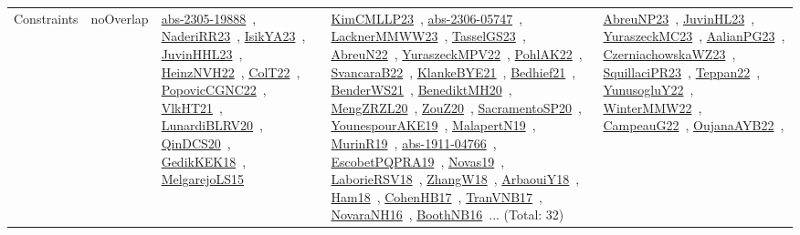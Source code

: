 {\begin{longtable}{lp{3cm}>{\raggedright\arraybackslash}p{6cm}>{\raggedright\arraybackslash}p{6cm}>{\raggedright\arraybackslash}p{8cm}}
Constraints & noOverlap & \href{works/abs-2305-19888.pdf}{abs-2305-19888}~\cite{abs-2305-19888}, \href{works/NaderiRR23.pdf}{NaderiRR23}~\cite{NaderiRR23}, \href{works/IsikYA23.pdf}{IsikYA23}~\cite{IsikYA23}, \href{works/JuvinHHL23.pdf}{JuvinHHL23}~\cite{JuvinHHL23}, \href{works/HeinzNVH22.pdf}{HeinzNVH22}~\cite{HeinzNVH22}, \href{works/ColT22.pdf}{ColT22}~\cite{ColT22}, \href{works/PopovicCGNC22.pdf}{PopovicCGNC22}~\cite{PopovicCGNC22}, \href{works/VlkHT21.pdf}{VlkHT21}~\cite{VlkHT21}, \href{works/LunardiBLRV20.pdf}{LunardiBLRV20}~\cite{LunardiBLRV20}, \href{works/QinDCS20.pdf}{QinDCS20}~\cite{QinDCS20}, \href{works/GedikKEK18.pdf}{GedikKEK18}~\cite{GedikKEK18}, \href{works/MelgarejoLS15.pdf}{MelgarejoLS15}~\cite{MelgarejoLS15} & \href{works/KimCMLLP23.pdf}{KimCMLLP23}~\cite{KimCMLLP23}, \href{works/abs-2306-05747.pdf}{abs-2306-05747}~\cite{abs-2306-05747}, \href{works/LacknerMMWW23.pdf}{LacknerMMWW23}~\cite{LacknerMMWW23}, \href{works/TasselGS23.pdf}{TasselGS23}~\cite{TasselGS23}, \href{works/AbreuN22.pdf}{AbreuN22}~\cite{AbreuN22}, \href{works/YuraszeckMPV22.pdf}{YuraszeckMPV22}~\cite{YuraszeckMPV22}, \href{works/PohlAK22.pdf}{PohlAK22}~\cite{PohlAK22}, \href{works/SvancaraB22.pdf}{SvancaraB22}~\cite{SvancaraB22}, \href{works/KlankeBYE21.pdf}{KlankeBYE21}~\cite{KlankeBYE21}, \href{works/Bedhief21.pdf}{Bedhief21}~\cite{Bedhief21}, \href{works/BenderWS21.pdf}{BenderWS21}~\cite{BenderWS21}, \href{works/BenediktMH20.pdf}{BenediktMH20}~\cite{BenediktMH20}, \href{works/MengZRZL20.pdf}{MengZRZL20}~\cite{MengZRZL20}, \href{works/ZouZ20.pdf}{ZouZ20}~\cite{ZouZ20}, \href{works/SacramentoSP20.pdf}{SacramentoSP20}~\cite{SacramentoSP20}, \href{works/YounespourAKE19.pdf}{YounespourAKE19}~\cite{YounespourAKE19}, \href{works/MalapertN19.pdf}{MalapertN19}~\cite{MalapertN19}, \href{works/MurinR19.pdf}{MurinR19}~\cite{MurinR19}, \href{works/abs-1911-04766.pdf}{abs-1911-04766}~\cite{abs-1911-04766}, \href{works/EscobetPQPRA19.pdf}{EscobetPQPRA19}~\cite{EscobetPQPRA19}, \href{works/Novas19.pdf}{Novas19}~\cite{Novas19}, \href{works/LaborieRSV18.pdf}{LaborieRSV18}~\cite{LaborieRSV18}, \href{works/ZhangW18.pdf}{ZhangW18}~\cite{ZhangW18}, \href{works/ArbaouiY18.pdf}{ArbaouiY18}~\cite{ArbaouiY18}, \href{works/Ham18.pdf}{Ham18}~\cite{Ham18}, \href{works/CohenHB17.pdf}{CohenHB17}~\cite{CohenHB17}, \href{works/TranVNB17.pdf}{TranVNB17}~\cite{TranVNB17}, \href{works/NovaraNH16.pdf}{NovaraNH16}~\cite{NovaraNH16}, \href{works/BoothNB16.pdf}{BoothNB16}~\cite{BoothNB16}... (Total: 32) & \href{works/AbreuNP23.pdf}{AbreuNP23}~\cite{AbreuNP23}, \href{works/JuvinHL23.pdf}{JuvinHL23}~\cite{JuvinHL23}, \href{works/YuraszeckMC23.pdf}{YuraszeckMC23}~\cite{YuraszeckMC23}, \href{works/AalianPG23.pdf}{AalianPG23}~\cite{AalianPG23}, \href{works/CzerniachowskaWZ23.pdf}{CzerniachowskaWZ23}~\cite{CzerniachowskaWZ23}, \href{works/SquillaciPR23.pdf}{SquillaciPR23}~\cite{SquillaciPR23}, \href{works/Teppan22.pdf}{Teppan22}~\cite{Teppan22}, \href{works/YunusogluY22.pdf}{YunusogluY22}~\cite{YunusogluY22}, \href{works/WinterMMW22.pdf}{WinterMMW22}~\cite{WinterMMW22}, \href{works/CampeauG22.pdf}{CampeauG22}~\cite{CampeauG22}, \href{works/OujanaAYB22.pdf}{OujanaAYB22}~\cite{OujanaAYB22}, 
\end{longtable}}
